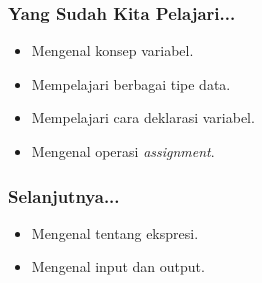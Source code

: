 \begin{frame}
\frametitle{Yang Sudah Kita Pelajari...}
\begin{itemize}
  \item Mengenal konsep variabel.
  \item Mempelajari berbagai tipe data.
  \item Mempelajari cara deklarasi variabel.
  \item Mengenal operasi \textit{assignment}.
\end{itemize}
\end{frame}

\begin{frame}
\frametitle{Selanjutnya...}
\begin{itemize}
  \item Mengenal tentang ekspresi.
  \item Mengenal input dan output.
\end{itemize}
\end{frame}


